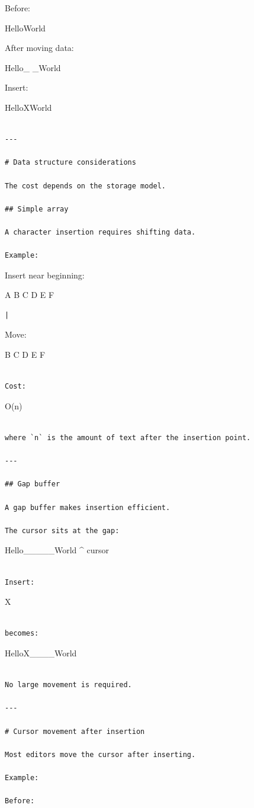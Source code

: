 \documentclass[
  oneside,
  openany]{book}
\begin{document}
Before:

HelloWorld

After moving data:

Hello\_ \_World

Insert:

HelloXWorld

\begin{verbatim}

---

# Data structure considerations

The cost depends on the storage model.

## Simple array

A character insertion requires shifting data.

Example:
\end{verbatim}

Insert near beginning:

A B C D E F

\begin{verbatim}
|
\end{verbatim}

Move:

B C D E F

\begin{verbatim}

Cost:
\end{verbatim}

O(n)

\begin{verbatim}

where `n` is the amount of text after the insertion point.

---

## Gap buffer

A gap buffer makes insertion efficient.

The cursor sits at the gap:
\end{verbatim}

Hello\_\_\_\_\_World \^{} cursor

\begin{verbatim}

Insert:
\end{verbatim}

X

\begin{verbatim}

becomes:
\end{verbatim}

HelloX\_\_\_\_World

\begin{verbatim}

No large movement is required.

---

# Cursor movement after insertion

Most editors move the cursor after inserting.

Example:

Before:
\end{verbatim}
\end{document}
